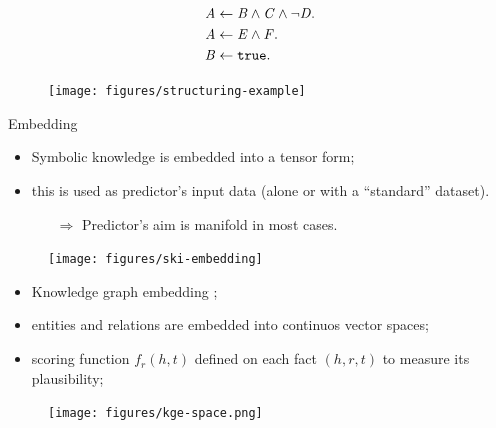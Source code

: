 \documentclass[presentation]{beamer}\mode<presentation>{\usetheme{AMSBolognaFC}}
\begin{document}
\begin{frame}[allowframebreaks]{\skilong}
{        \begin{minipage}{0.45\textwidth}
            \begin{equation*}
                \begin{aligned}
                    \mathit{A}&\leftarrow\mathit{B}\wedge\mathit{C}\wedge\neg\mathit{D}.\\
                    \mathit{A}&\leftarrow\mathit{E}\wedge\mathit{F}.\\
                    \mathit{B}&\leftarrow\mathtt{true}.\\
                \end{aligned}    
            \end{equation*}
        \end{minipage}
        \begin{minipage}{0.45\textwidth}
            \begin{figure}
                \centering
                \texttt{[image: figures/structuring-example]}
            \end{figure}
        \end{minipage}
        
        \framebreak
        
        \begin{block}{Embedding}
            
            \begin{itemize}
                \item Symbolic knowledge is embedded into a tensor form;
                \item this is used as predictor's input data (alone or with a ``standard'' dataset).
                \begin{itemize}
                    \item[$\Rightarrow$] Predictor's aim is manifold in most cases.
                \end{itemize} 
            \end{itemize}
            
        \end{block}
        
        \begin{figure}
            \centering
            \texttt{[image: figures/ski-embedding]}
        \end{figure}
        
        \framebreak
        \begin{itemize}
            \item Knowledge graph embedding ;
            \item entities and relations are embedded into continuos vector spaces;
            \item scoring function $f_{r}(h,t)$ defined on each fact $(h, r, t)$ to measure its plausibility;
        \end{itemize}
        \begin{figure}
            \centering
            \texttt{[image: figures/kge-space.png]}
        \end{figure}
        
}
\end{frame}
\end{document}
